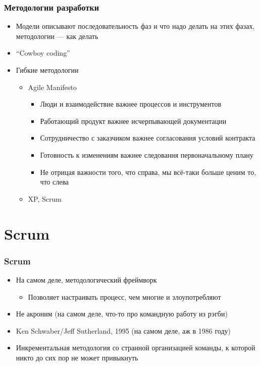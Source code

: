 \documentclass{../../slides-style}
\begin{document}
    \begin{frame}
        \frametitle{Методологии разработки}
        \begin{itemize}
            \item Модели описывают последовательность фаз и что надо делать на этих фазах, методологии --- как делать
            \item ``Cowboy coding''
            \item Гибкие методологии
            \begin{itemize}
                \item Agile Manifesto
                \begin{itemize}
                    \item Люди и взаимодействие важнее процессов и инструментов
                    \item Работающий продукт важнее исчерпывающей документации
                    \item Сотрудничество с заказчиком важнее согласования условий контракта
                    \item Готовность к изменениям важнее следования первоначальному плану
                    \item Не отрицая важности того, что справа, мы всё-таки больше ценим то, что слева
                \end{itemize}
                \item XP, Scrum
            \end{itemize}
        \end{itemize}
    \end{frame}

    \section{Scrum}

    \begin{frame}
        \frametitle{Scrum}
        \begin{itemize}
            \item На самом деле, методологический фреймворк
            \begin{itemize}
                \item Позволяет настраивать процесс, чем многие и злоупотребляют
            \end{itemize}
            \item Не акроним (на самом деле, что-то про командную работу из рэгби)
            \item Ken Schwaber/Jeff Sutherland, 1995 (на самом деле, аж в 1986 году)
            \item Инкрементальная методология со странной организацией команды, к которой никто до сих пор не может привыкнуть
        \end{itemize}
    \end{frame}
\end{document}
